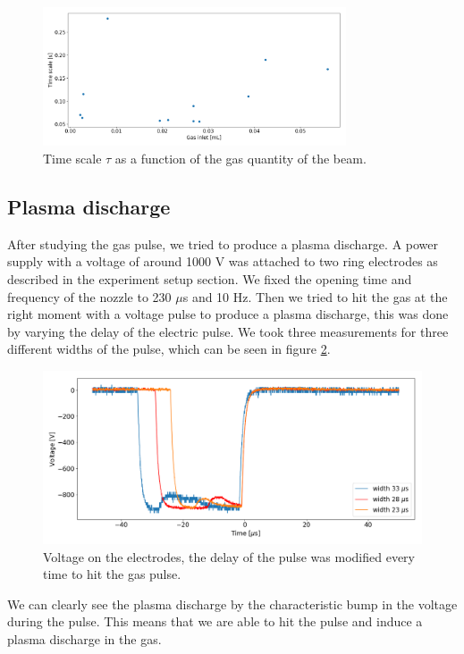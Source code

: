 \documentclass[a4paper,10pt]{article}
\begin{document}
\begin{figure}[H]
\centering
\includegraphics[width = 0.8\textwidth]{gasinlettimescale}
\caption{Time scale $\tau$ as a function of the gas quantity of the beam.}\label{gasinlettimescale}
\end{figure}

\subsection{Plasma discharge}
After studying the gas pulse, we tried to produce a plasma discharge. A power supply with a voltage of around 1000 V was attached to two ring electrodes as described in the experiment setup section. We fixed the opening time and frequency of the nozzle to 230 $\mu$s and 10 Hz. Then we tried to hit the gas at the right moment with a voltage pulse to produce a plasma discharge, this was done by varying the delay of the electric pulse. We took three measurements for three different widths of the pulse, which can be seen in figure \ref{discharge}. 

\begin{figure}[H]
\centering
\includegraphics[width = \textwidth]{discharge}
\caption{Voltage on the electrodes, the delay of the pulse was modified every time to hit the gas pulse.}\label{discharge}
\end{figure}

We can clearly see the plasma discharge by the characteristic bump in the voltage during the pulse. This means that we are able to hit the pulse and induce a plasma discharge in the gas.
\end{document}
